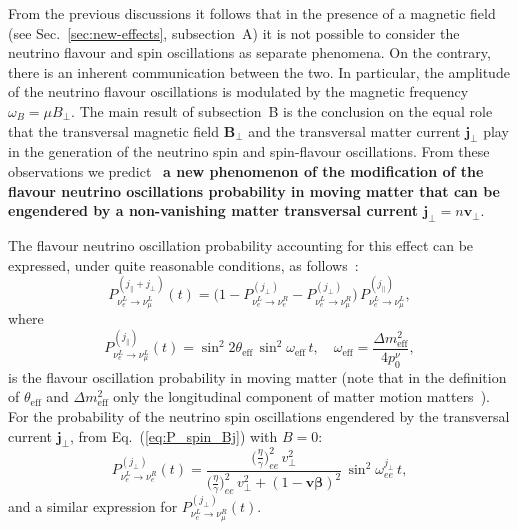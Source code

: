 \documentclass[a4paper,11pt]{article}
\begin{document}
From the previous discussions it follows that in the presence of a magnetic field (see Sec.~\ref{sec:new-effects}, subsection~A) it is not possible to consider the neutrino flavour and spin oscillations as separate phenomena. On the contrary, there is an inherent communication between the two. In particular, the amplitude of the neutrino flavour oscillations is modulated by the magnetic frequency $\omega_B = \mu B_\perp$. The main result of subsection~B is the conclusion on the equal role that the transversal magnetic field $\mathbf{B}_\perp$ and the transversal matter current $\mathbf{j}_\perp$ play in the generation of the neutrino spin and spin-flavour oscillations. From these observations we predict~\cite{Studenikin:2019arXiv} \textbf{a new phenomenon of the modification of the flavour neutrino oscillations probability in moving matter that can be engendered by a non-vanishing matter transversal current $\mathbf{j}_\perp = n\mathbf{v}_\perp$}.

The flavour neutrino oscillation probability accounting for this effect can be expressed, under quite reasonable conditions, as follows~\cite{Studenikin:2019arXiv}:
\begin{equation}
\label{eq:P_flavour_j}
P_{\nu_e^L \to \nu_\mu^L}^{(j_\parallel + j_\perp)}(t) = \Big(1 - P_{\nu_e^L \to \nu_e^R}^{(j_\perp)} - P_{\nu_e^L \to \nu_\mu^R}^{(j_\perp)}\Big)\,P_{\nu_e^L \to \nu_\mu^L}^{(j_\parallel)},
\end{equation}
where
\begin{equation}
P_{\nu_e^L \to \nu_\mu^L}^{(j_\parallel)}(t) = \sin^2 2\theta_{\text{eff}}\,\sin^2\omega_{\text{eff}}\,t, \quad \omega_{\text{eff}} = \frac{\Delta m_{\text{eff}}^2}{4p_0^\nu},
\end{equation}
is the flavour oscillation probability in moving matter (note that in the definition of $\theta_{\text{eff}}$ and $\Delta m_{\text{eff}}^2$ only the longitudinal component of matter motion matters~\cite{Grigoriev:Lobanov:Studenikin:2002PLB}). For the probability of the neutrino spin oscillations engendered by the transversal current $\mathbf{j}_\perp$, from Eq.~(\ref{eq:P_spin_Bj}) with $B = 0$:
\begin{equation}
\label{eq:P_spin_j2}
P_{\nu_e^L \to \nu_e^R}^{(j_\perp)}(t) = \frac{\Big(\frac{\eta}{\gamma}\Big)_{ee}^2\,v_\perp^2}{\Big(\frac{\eta}{\gamma}\Big)_{ee}^2\,v_\perp^2 + (1 - \mathbf{v}\boldsymbol{\beta})^2}\,\sin^2\omega_{ee}^{j_\perp}\,t,
\end{equation}
and a similar expression for $P_{\nu_e^L \to \nu_\mu^R}^{(j_\perp)}(t)$.
\end{document}

